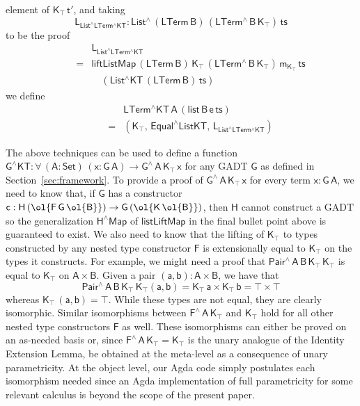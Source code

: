 \documentclass[sigplan,10pt]{acmart}
\begin{document}
\begin{itemize}
  element of $\mathsf{K_\top\, t'}$, and taking
  \[\mathsf{L_{List^\wedge LTerm^\wedge KT} : List^{\wedge}\,
    (LTerm\,B) \, (LTerm^{\wedge} \, B\, K_\top) \, ts}\] to be the
  proof
\[\begin{array}{ll}
& \!\!\mathsf{ L_{List^\wedge LTerm^\wedge KT}}\\
\quad\quad= & 
 \!\!\mathsf{liftListMap \, (LTerm\,B) \, K_\top \, (LTerm^{\wedge}\,
   B\, K_\top) \, m_{K_\top} \, ts}\\
 & \!\!\quad \mathsf{(List^\wedge KT\, (LTerm\, B)\,
   ts) }
\end{array}\]
we define
\[\begin{array}{ll}
 & \!\!\mathsf{LTerm^\wedge KT\,A\, (list\, B\, e\,
  ts)}\\
\quad\quad = & \!\!\mathsf{(K_\top , \, Equal^\wedge ListKT , \, L_{List^\wedge
    LTerm^\wedge KT} ) }
\end{array}\]
\end{itemize}

The above techniques can be used to define a function
$\mathsf{G^\wedge KT : \forall\, (A : Set)\, (x : G\,A) \to
  G^{\wedge}\, A\, K_\top\, x}$ for any GADT $\mathsf{G}$ as defined
in Section~\ref{sec:framework}.  To provide a proof of
$\mathsf{G^{\wedge}\, A\, K_\top \, x}$ for every term $\mathsf{x :
  G\, A}$, we need to know that, if $\mathsf{G}$ has a constructor
$\mathsf{c : H \, (\ol{F\,G\, \ol{B}}) \to G\, (\ol{K\,\ol{B}})}$,
then $\mathsf{H}$ cannot construct a GADT so the generalization
$\mathsf{H^\wedge Map}$ of $\mathsf{listLiftMap}$ in the final bullet
point above is guaranteed to exist. We also need to know that the
lifting of $\mathsf{K_\top}$ to types constructed by any nested type
constructor $\mathsf{F}$ is extensionally equal to $\mathsf{K_\top}$
on the types it constructs. For example, we might need a proof that
$\mathsf{Pair^{\wedge}\,A\,B\,K_\top\,K_\top}$ is equal to
$\mathsf{K_\top}$ on $\mathsf{A \times B}$.  Given a pair $\mathsf{(a
  , b) : A \times B}$, we have that
\[\mathsf{Pair^{\wedge}\,A\,B\,K_\top\,K_\top (a, b) = K_\top \, a
  \times K_\top\, b = \top \times \top}\] whereas $\mathsf{K_\top\,
  (a, b) = \top}$. While these types are not equal, they are clearly
isomorphic. Similar isomorphisms between
$\mathsf{F^{\wedge}\,A\,K_\top}$ and $\mathsf{K_\top}$ hold for all
other nested type constructors $\mathsf{F}$ as well. These
isomorphisms can either be proved on an as-needed basis or, since
$\mathsf{F^\wedge\,A\,K_\top = K_\top}$ is the unary analogue of the
Identity Extension Lemma, be obtained at the meta-level as a
consequence of unary parametricity. At the object level, our Agda
code
simply postulates each isomorphism needed since
an Agda implementation of full parametricity for some relevant
calculus is beyond the scope of the present paper.
\end{document}
